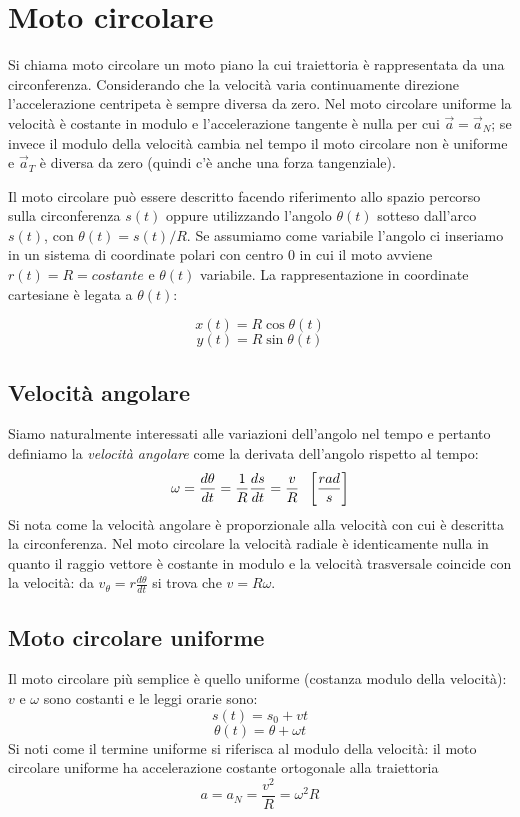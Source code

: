\documentclass[class=book, crop=false, oneside, 12pt]{standalone}
\begin{document}
\section{Moto circolare}
Si chiama moto circolare un moto piano la cui traiettoria è rappresentata da una circonferenza.
Considerando che la velocità varia continuamente direzione l'accelerazione centripeta è sempre diversa da zero.
Nel moto circolare uniforme la velocità è costante in modulo e l'accelerazione tangente è nulla per cui \(\overrightarrow{a} = \overrightarrow{a}_N\);
se invece il modulo della velocità cambia nel tempo il moto circolare non è uniforme e \(\overrightarrow{a}_T\) è diversa da zero (quindi c'è anche una forza tangenziale).

Il moto circolare può essere descritto facendo riferimento allo spazio percorso sulla circonferenza \(s(t)\) oppure
utilizzando l'angolo \(\theta (t)\) sotteso dall'arco \(s(t)\), con \(\theta(t) = s(t)/R\).
Se assumiamo come variabile l'angolo ci inseriamo in un sistema di coordinate polari con centro \(0\) in cui il moto avviene \(r(t) = R = costante\) e \(\theta(t)\) variabile.
La rappresentazione in coordinate cartesiane \`e legata a $\theta(t)$:
\begin{multicols}{2}
  \noindent
  $$x(t)=R\cos\theta(t)$$
  $$y(t)=R\sin\theta(t)$$
\end{multicols}
  \subsection{Velocit\`a angolare}
  Siamo naturalmente interessati alle variazioni dell'angolo nel tempo e pertanto definiamo la \emph{velocità angolare} come la derivata dell'angolo rispetto al tempo:
  \begin{equation}
   \omega = \frac{d \theta}{dt} = \frac{1}{R} \frac {ds} {dt} = \frac{v}{R} \hspace{0.2cm} \left[\frac{rad}{s}\right]
  \end{equation}
	Si nota come la velocit\`a angolare \`e proporzionale alla velocit\`a con cui \`e descritta la circonferenza.
	Nel moto circolare la velocit\`a radiale \`e identicamente nulla in quanto il raggio vettore \`e costante in modulo e la velocit\`a trasversale coincide con la velocit\`a: da $v_\theta=r\frac{d\theta}{dt}$ si trova che $v=R\omega$.
  \subsection{Moto circolare uniforme}
  Il moto circolare più semplice è quello uniforme (costanza modulo della velocità): \(v\) e \(\omega\) sono costanti e le leggi orarie sono:
  \begin{equation}
    s(t) = s_0 + vt
  \end{equation}
  \begin{equation}
    \theta(t) = \theta + \omega t
  \end{equation}
  Si noti come il termine uniforme si riferisca al modulo della velocit\`a: il moto circolare uniforme ha accelerazione costante ortogonale alla traiettoria
  \begin{equation}
   a = a_N = \frac{v^2}{R} = \omega^2 R
  \end{equation}
\end{document}
